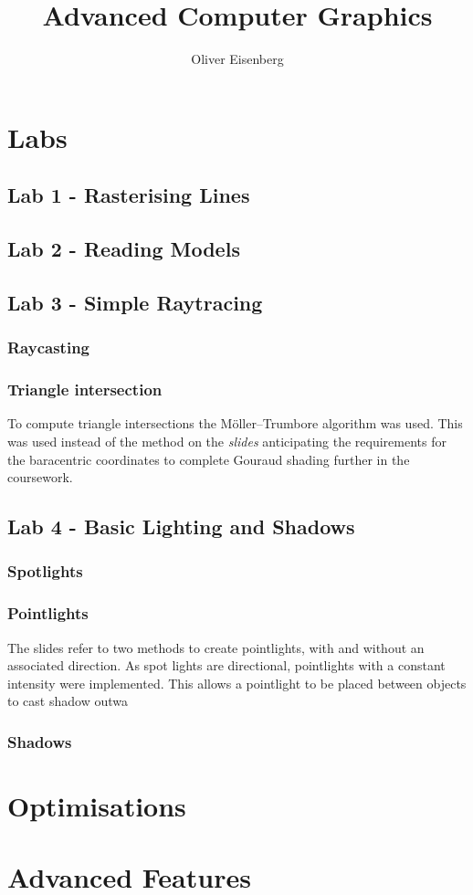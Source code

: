 \documentclass{article}
\begin{document}
\title{Advanced Computer Graphics}
\author{Oliver Eisenberg}
\maketitle
\pagebreak
\tableofcontents
\pagebreak
\twocolumn
\section{Labs}
\subsection{Lab 1 - Rasterising Lines}

\subsection{Lab 2 - Reading Models}

\subsection{Lab 3 - Simple Raytracing}
\subsubsection{Raycasting }
\subsubsection{Triangle intersection}
To compute triangle intersections the Möller–Trumbore algorithm was used. This was used instead of the method on the \textit{slides} anticipating the requirements for the baracentric coordinates to complete Gouraud shading further in the coursework.

\subsection{Lab 4 - Basic Lighting and Shadows}
\subsubsection{Spotlights}

\subsubsection{Pointlights}
The slides refer to two methods to create pointlights, with and without an associated direction. As spot lights are directional, pointlights with a constant intensity were implemented. This allows a pointlight to be placed between objects to cast shadow outwa
\subsubsection{Shadows}

\section{Optimisations}

\section{Advanced Features}
\end{document}
